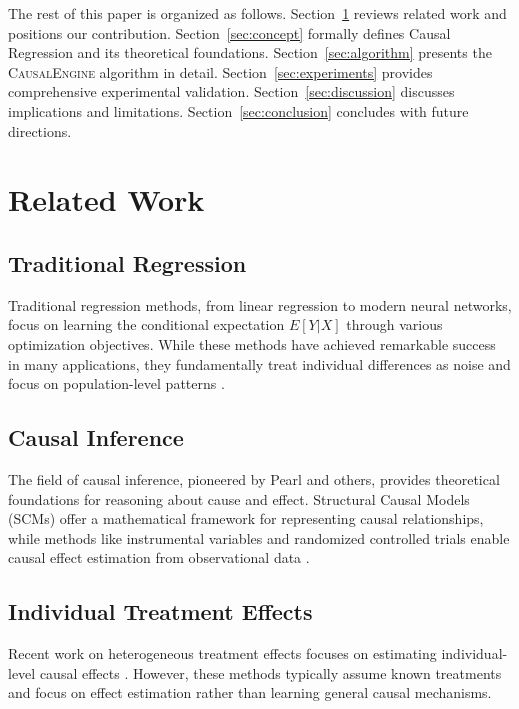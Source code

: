 \documentclass[conference]{IEEEtran}
\newcommand{\causalengine}{\textsc{CausalEngine}}
\begin{document}
The rest of this paper is organized as follows. Section~\ref{sec:related} reviews related work and positions our contribution. Section~\ref{sec:concept} formally defines Causal Regression and its theoretical foundations. Section~\ref{sec:algorithm} presents the \causalengine{} algorithm in detail. Section~\ref{sec:experiments} provides comprehensive experimental validation. Section~\ref{sec:discussion} discusses implications and limitations. Section~\ref{sec:conclusion} concludes with future directions.

\section{Related Work}
\label{sec:related}

\subsection{Traditional Regression}
Traditional regression methods, from linear regression to modern neural networks, focus on learning the conditional expectation $E[Y|X]$ through various optimization objectives. While these methods have achieved remarkable success in many applications, they fundamentally treat individual differences as noise and focus on population-level patterns \cite{hastie2009elements}.

\subsection{Causal Inference}
The field of causal inference, pioneered by Pearl \cite{pearl2009causality} and others, provides theoretical foundations for reasoning about cause and effect. Structural Causal Models (SCMs) offer a mathematical framework for representing causal relationships, while methods like instrumental variables and randomized controlled trials enable causal effect estimation from observational data \cite{imbens2015causal}.

\subsection{Individual Treatment Effects}
Recent work on heterogeneous treatment effects focuses on estimating individual-level causal effects \cite{kunzel2019metalearners, nie2021quasi}. However, these methods typically assume known treatments and focus on effect estimation rather than learning general causal mechanisms.
\end{document}
